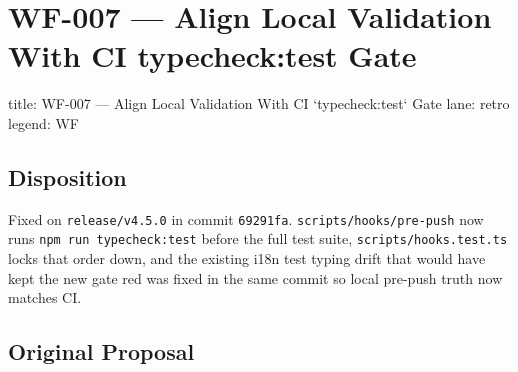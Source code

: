 \chapter{WF-007 --- Align Local Validation With CI typecheck:test Gate}\label{record-409}

\smallskip

\begin{RecordMeta}
title: WF-007 — Align Local Validation With CI `typecheck:test` Gate
lane: retro
legend: WF

\end{RecordMeta}

\section{Disposition}\label{record-409-disposition}

Fixed on \texttt{r\allowbreak{}e\allowbreak{}l\allowbreak{}e\allowbreak{}a\allowbreak{}s\allowbreak{}e\allowbreak{}/\allowbreak{}v\allowbreak{}4\allowbreak{}.\allowbreak{}5\allowbreak{}.\allowbreak{}0} in commit \texttt{6\allowbreak{}9\allowbreak{}2\allowbreak{}9\allowbreak{}1\allowbreak{}f\allowbreak{}a}. \texttt{s\allowbreak{}c\allowbreak{}r\allowbreak{}i\allowbreak{}p\allowbreak{}t\allowbreak{}s\allowbreak{}/\allowbreak{}h\allowbreak{}o\allowbreak{}o\allowbreak{}k\allowbreak{}s\allowbreak{}/\allowbreak{}p\allowbreak{}r\allowbreak{}e\allowbreak{}-\allowbreak{}p\allowbreak{}u\allowbreak{}s\allowbreak{}h} now runs \texttt{n\allowbreak{}p\allowbreak{}m\allowbreak{} \allowbreak{}r\allowbreak{}u\allowbreak{}n\allowbreak{} \allowbreak{}t\allowbreak{}y\allowbreak{}p\allowbreak{}e\allowbreak{}c\allowbreak{}h\allowbreak{}e\allowbreak{}c\allowbreak{}k\allowbreak{}:\allowbreak{}t\allowbreak{}e\allowbreak{}s\allowbreak{}t} before the full test suite, \texttt{s\allowbreak{}c\allowbreak{}r\allowbreak{}i\allowbreak{}p\allowbreak{}t\allowbreak{}s\allowbreak{}/\allowbreak{}h\allowbreak{}o\allowbreak{}o\allowbreak{}k\allowbreak{}s\allowbreak{}.\allowbreak{}t\allowbreak{}e\allowbreak{}s\allowbreak{}t\allowbreak{}.\allowbreak{}t\allowbreak{}s} locks that order down, and the existing i18n test typing drift that would have kept the new gate red was fixed in the same commit so local pre-push truth now matches CI.

\section{Original Proposal}\label{record-409-original-proposal}

